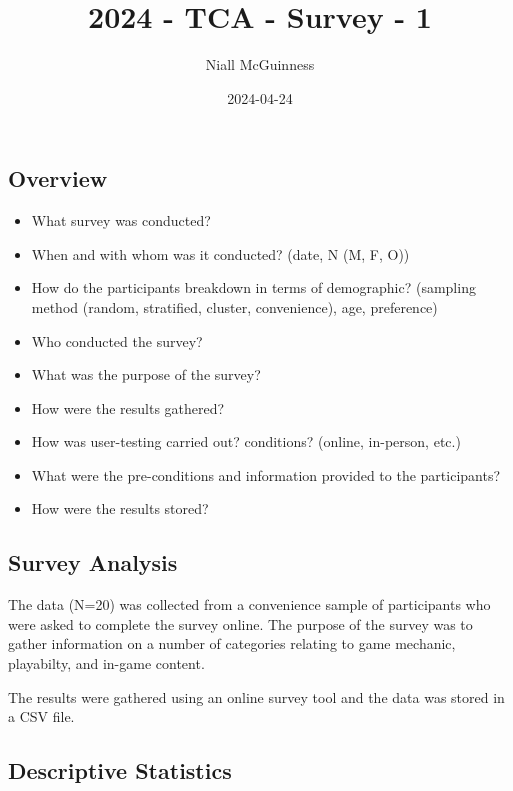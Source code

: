 \documentclass[
  letterpaper,
  DIV=11,
  numbers=noendperiod]{scrartcl}
\title{2024 - TCA - Survey - 1}
\author{Niall McGuinness}
\date{2024-04-24}
\providecommand{\tightlist}{%
  \setlength{\itemsep}{0pt}\setlength{\parskip}{0pt}}\usepackage{longtable,booktabs,array}
\renewcommand*\contentsname{Table of contents}
\newcommand\contentsname{Table of contents}
\begin{document}
\maketitle

\renewcommand*\contentsname{Table of contents}
{
\hypersetup{linkcolor=}
\setcounter{tocdepth}{3}
\tableofcontents
}
\subsection{Overview}\label{overview}

\begin{itemize}
\tightlist
\item
  What survey was conducted?
\item
  When and with whom was it conducted? (date, N (M, F, O))
\item
  How do the participants breakdown in terms of demographic? (sampling
  method (random, stratified, cluster, convenience), age, preference)
\item
  Who conducted the survey?
\item
  What was the purpose of the survey?
\item
  How were the results gathered?
\item
  How was user-testing carried out? conditions? (online, in-person,
  etc.)
\item
  What were the pre-conditions and information provided to the
  participants?
\item
  How were the results stored?
\end{itemize}

\subsection{Survey Analysis}\label{survey-analysis}

The data (N=20) was collected from a convenience sample of participants
who were asked to complete the survey online. The purpose of the survey
was to gather information on a number of categories relating to game
mechanic, playabilty, and in-game content.

The results were gathered using an online survey tool and the data was
stored in a CSV file.

\subsection{Descriptive Statistics}\label{descriptive-statistics}
\end{document}
